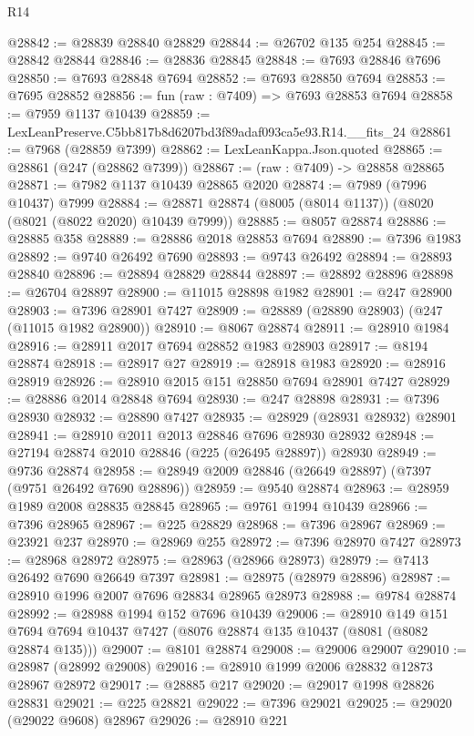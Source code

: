 \begin{lexlean}{R14}
\begin{coremodule}
@28842 := @28839 @28840 @28829
@28844 := @26702 @135 @254
@28845 := @28842 @28844
@28846 := @28836 @28845
@28848 := @7693 @28846 @7696
@28850 := @7693 @28848 @7694
@28852 := @7693 @28850 @7694
@28853 := @7695 @28852
@28856 := fun (raw : @7409) => @7693 @28853 @7694
@28858 := @7959 @1137 @10439
@28859 := LexLeanPreserve.C5bb817b8d6207bd3f89adaf093ca5e93.R14.__fits_24
@28861 := @7968 (@28859 @7399)
@28862 := LexLeanKappa.Json.quoted
@28865 := @28861 (@247 (@28862 @7399))
@28867 := (raw : @7409) -> @28858 @28865
@28871 := @7982 @1137 @10439 @28865 @2020
@28874 := @7989 (@7996 @10437) @7999
@28884 := @28871 @28874 (@8005 (@8014 @1137)) (@8020 (@8021 (@8022 @2020) @10439 @7999))
@28885 := @8057 @28874
@28886 := @28885 @358
@28889 := @28886 @2018 @28853 @7694
@28890 := @7396 @1983
@28892 := @9740 @26492 @7690
@28893 := @9743 @26492
@28894 := @28893 @28840
@28896 := @28894 @28829 @28844
@28897 := @28892 @28896
@28898 := @26704 @28897
@28900 := @11015 @28898 @1982
@28901 := @247 @28900
@28903 := @7396 @28901 @7427
@28909 := @28889 (@28890 @28903) (@247 (@11015 @1982 @28900))
@28910 := @8067 @28874
@28911 := @28910 @1984
@28916 := @28911 @2017 @7694 @28852 @1983 @28903
@28917 := @8194 @28874
@28918 := @28917 @27
@28919 := @28918 @1983
@28920 := @28916 @28919
@28926 := @28910 @2015 @151 @28850 @7694 @28901 @7427
@28929 := @28886 @2014 @28848 @7694
@28930 := @247 @28898
@28931 := @7396 @28930
@28932 := @28890 @7427
@28935 := @28929 (@28931 @28932) @28901
@28941 := @28910 @2011 @2013 @28846 @7696 @28930 @28932
@28948 := @27194 @28874 @2010 @28846 (@225 (@26495 @28897)) @28930
@28949 := @9736 @28874
@28958 := @28949 @2009 @28846 (@26649 @28897) (@7397 (@9751 @26492 @7690 @28896))
@28959 := @9540 @28874
@28963 := @28959 @1989 @2008 @28835 @28845
@28965 := @9761 @1994 @10439
@28966 := @7396 @28965
@28967 := @225 @28829
@28968 := @7396 @28967
@28969 := @23921 @237
@28970 := @28969 @255
@28972 := @7396 @28970 @7427
@28973 := @28968 @28972
@28975 := @28963 (@28966 @28973)
@28979 := @7413 @26492 @7690 @26649 @7397
@28981 := @28975 (@28979 @28896)
@28987 := @28910 @1996 @2007 @7696 @28834 @28965 @28973
@28988 := @9784 @28874
@28992 := @28988 @1994 @152 @7696 @10439
@29006 := @28910
    @149
    @151
    @7694
    @7694
    @10437
    @7427
    (@8076 @28874 @135 @10437 (@8081 (@8082 @28874 @135)))
@29007 := @8101 @28874
@29008 := @29006 @29007
@29010 := @28987 (@28992 @29008)
@29016 := @28910 @1999 @2006 @28832 @12873 @28967 @28972
@29017 := @28885 @217
@29020 := @29017 @1998 @28826 @28831
@29021 := @225 @28821
@29022 := @7396 @29021
@29025 := @29020 (@29022 @9608) @28967
@29026 := @28910 @221

\end{coremodule}
\end{lexlean}

